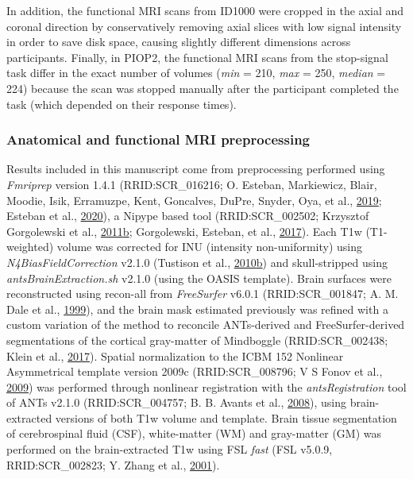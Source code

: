 \documentclass[11pt,american,a4paper,oneside,]{memoir} %
\begin{document}
In addition, the functional MRI scans from ID1000 were cropped in the axial and coronal direction by conservatively removing axial slices with low signal intensity in order to save disk space, causing slightly different dimensions across participants. Finally, in PIOP2, the functional MRI scans from the stop-signal task differ in the exact number of volumes (\emph{min} = 210, \emph{max} = 250, \emph{median} = 224) because the scan was stopped manually after the participant completed the task (which depended on their response times).

\hypertarget{anatomical-and-functional-mri-preprocessing}{%
\subsubsection{Anatomical and functional MRI preprocessing}\label{anatomical-and-functional-mri-preprocessing}}

Results included in this manuscript come from preprocessing performed using \emph{Fmriprep} version 1.4.1 (RRID:SCR\_016216; O. Esteban, Markiewicz, Blair, Moodie, Isik, Erramuzpe, Kent, Goncalves, DuPre, Snyder, Oya, et al., \protect\hyperlink{ref-Esteban2019-ri}{2019}; Esteban et al., \protect\hyperlink{ref-Esteban2020-qw}{2020}), a Nipype based tool (RRID:SCR\_002502; Krzysztof Gorgolewski et al., \protect\hyperlink{ref-Gorgolewski2011-aa}{2011}\protect\hyperlink{ref-Gorgolewski2011-aa}{b}; Gorgolewski, Esteban, et al., \protect\hyperlink{ref-Gorgolewski2017-gb}{2017}). Each T1w (T1-weighted) volume was corrected for INU (intensity non-uniformity) using \emph{N4BiasFieldCorrection} v2.1.0 (Tustison et al., \protect\hyperlink{ref-Tustison2010-tk}{2010}\protect\hyperlink{ref-Tustison2010-tk}{b}) and skull-stripped using \emph{antsBrainExtraction.sh} v2.1.0 (using the OASIS template). Brain surfaces were reconstructed using recon-all from \emph{FreeSurfer} v6.0.1 (RRID:SCR\_001847; A. M. Dale et al., \protect\hyperlink{ref-Dale1999-rk}{1999}), and the brain mask estimated previously was refined with a custom variation of the method to reconcile ANTs-derived and FreeSurfer-derived segmentations of the cortical gray-matter of Mindboggle (RRID:SCR\_002438; Klein et al., \protect\hyperlink{ref-Klein2017-su}{2017}). Spatial normalization to the ICBM 152 Nonlinear Asymmetrical template version 2009c (RRID:SCR\_008796; V S Fonov et al., \protect\hyperlink{ref-Fonov2009-sr}{2009}) was performed through nonlinear registration with the \emph{antsRegistration} tool of ANTs v2.1.0 (RRID:SCR\_004757; B. B. Avants et al., \protect\hyperlink{ref-Avants2008-bv}{2008}), using brain-extracted versions of both T1w volume and template. Brain tissue segmentation of cerebrospinal fluid (CSF), white-matter (WM) and gray-matter (GM) was performed on the brain-extracted T1w using FSL \emph{fast} (FSL v5.0.9, RRID:SCR\_002823; Y. Zhang et al., \protect\hyperlink{ref-Zhang2001-wa}{2001}).
\end{document}
